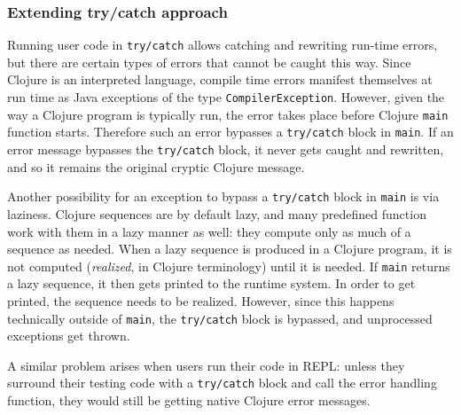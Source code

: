 \documentclass[submission,copyright,creativecommons]{eptcs}
\newcommand{\allcomments}[1]{{#1}}
\newcommand{\elenacomment}[1]{{\bf \textcolor{ForestGreen}{\allcomments{{#1}}}}}
\newcommand{\stephencomment}[1]{{\bf \color{StephensBlue}{\allcomments{{#1}}}}} %
\newcommand{\joecomment}[1]{{\bf \color{JoesGold}{\allcomments{{#1}}}}}
\newcommand{\clocode}[1]{{\tt {#1}}}
\begin{document}

\subsubsection{Extending try/catch approach}
Running user code in {\tt try/catch} allows catching and rewriting run-time errors, but there are certain types of errors that cannot be caught this way. Since Clojure is an interpreted language, compile time errors manifest themselves at run time as Java exceptions of the type {\tt CompilerException}. However, given the way a Clojure program is typically run, the error takes place before Clojure \clocode{main} function starts. Therefore such an error bypasses a {\tt try/catch} block in {\tt main}. If an error message bypasses the {\tt try/catch} block, it never gets caught and rewritten, and so it remains the original cryptic Clojure message.

Another possibility for an exception to bypass a {\tt try/catch} block in {\tt main} is via laziness. Clojure sequences are by default lazy, and many predefined function work with them in a lazy manner as well: they compute only as much of a sequence as needed. When a lazy sequence is produced in a Clojure program, it is not computed ({\it realized}, in Clojure terminology) until it is needed. If {\tt main} returns a lazy sequence, it then gets printed to the runtime system. In order to get printed, the sequence needs to be realized. However, since this happens technically outside of {\tt main}, the {\tt try/catch} block is bypassed, and unprocessed exceptions get thrown. 

A similar problem arises when users run their code in REPL: unless they surround their testing code with a {\tt try/catch} block and call the error handling function, they would still be getting native Clojure error messages. 
\end{document}
